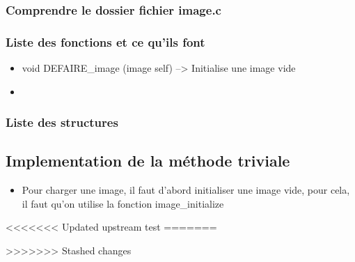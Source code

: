 \documentclass[10pt,a4paper]{article}
\begin{document}
\subsubsection{Comprendre le dossier fichier image.c}
\subsubsection{Liste des fonctions et ce qu'ils font}

\begin{itemize}
\item void DEFAIRE\_image (image self) --> Initialise une image vide
\item 
\end{itemize}
\subsubsection{Liste des structures}
\subsection{Implementation de la méthode triviale}
\begin{itemize}
\item Pour charger une image, il faut d'abord initialiser une image vide, pour cela, il faut qu'on utilise la fonction image\_initialize
\end{itemize}
<<<<<<< Updated upstream
test
=======

>>>>>>> Stashed changes
\end{document}
